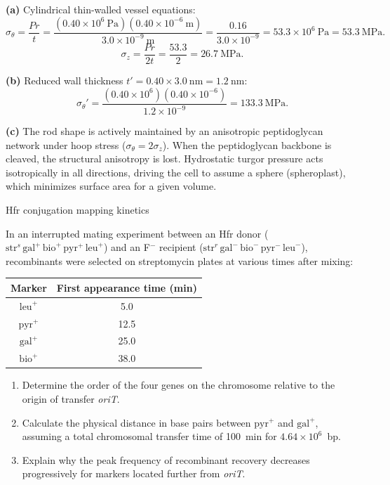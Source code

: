 \documentclass[12pt, a4paper, oneside]{report}
\begin{document}
\begin{solution}
  \textbf{(a)} Cylindrical thin-walled vessel equations:
  \[
    \sigma_\theta = \frac{Pr}{t} = \frac{(0.40 \times 10^6~\text{Pa})(0.40 \times 10^{-6}~\text{m})}{3.0 \times 10^{-9}~\text{m}} = \frac{0.16}{3.0 \times 10^{-9}} = 53.3 \times 10^6~\text{Pa} = 53.3~\text{MPa}.
  \]
  \[
    \sigma_z = \frac{Pr}{2t} = \frac{53.3}{2} = 26.7~\text{MPa}.
  \]

  \textbf{(b)} Reduced wall thickness $t' = 0.40 \times 3.0~\text{nm} = 1.2~\text{nm}$:
  \[
    \sigma_\theta' = \frac{(0.40 \times 10^6)(0.40 \times 10^{-6})}{1.2 \times 10^{-9}} = 133.3~\text{MPa}.
  \]

  \textbf{(c)} The rod shape is actively maintained by an anisotropic peptidoglycan network under hoop stress ($\sigma_\theta = 2\sigma_z$). When the peptidoglycan backbone is cleaved, the structural anisotropy is lost. Hydrostatic turgor pressure acts isotropically in all directions, driving the cell to assume a sphere (spheroplast), which minimizes surface area for a given volume.
\end{solution}

\begin{problem}{\enspace{}\enspace
  Hfr conjugation mapping kinetics}

  In an interrupted mating experiment between an Hfr donor ($\text{str}^s\,\text{gal}^+\,\text{bio}^+\,\text{pyr}^+\,\text{leu}^+$) and an F$^-$ recipient ($\text{str}^r\,\text{gal}^-\,\text{bio}^-\,\text{pyr}^-\,\text{leu}^-$), recombinants were selected on streptomycin plates at various times after mixing:

  \begin{center}
  \begin{tabular}{cc}
  \toprule
  Marker & First appearance time (min) \\
  \midrule
  $\text{leu}^+$ & 5.0 \\
  $\text{pyr}^+$ & 12.5 \\
  $\text{gal}^+$ & 25.0 \\
  $\text{bio}^+$ & 38.0 \\
  \bottomrule
  \end{tabular}
  \end{center}

  \begin{enumerate}
    \item Determine the order of the four genes on the chromosome relative to the origin of transfer \textit{oriT}.
    \item Calculate the physical distance in base pairs between $\text{pyr}^+$ and $\text{gal}^+$, assuming a total chromosomal transfer time of 100~min for $4.64 \times 10^6$~bp.
    \item Explain why the peak frequency of recombinant recovery decreases progressively for markers located further from \textit{oriT}.
  \end{enumerate}
\end{problem}
\end{document}
